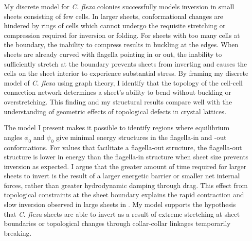 My discrete model for \textit{C. flexa} colonies successfully models inversion in small sheets consisting of few cells. 
In larger sheets, conformational changes are hindered by rings of cells which cannot undergo the requisite stretching or compression required for inversion or folding. 
For sheets with too many cells at the boundary, the inability to compress results in buckling at the edges. 
When sheets are already curved with flagella pointing in or out, the inability to sufficiently stretch at the boundary prevents sheets from inverting and causes the cells on the sheet interior to experience substantial stress.
By framing my discrete model of \textit{C. flexa} using graph theory, I identify that the topology of the cell-cell connection network determines a sheet's ability to bend without buckling or overstretching.
This finding and my structural results compare well with the understanding of geometric effects of topological defects in crystal lattices.

The model I present makes it possible to identify regions where equilibrium angles $\phi_0$ and $\psi_0$ give minimal energy structures in the flagella-in and -out conformations.
For values that facilitate a flagella-out structure, the flagella-out structure is lower in energy than the flagella-in structure when sheet size prevents inversion as expected.
I argue that the greater amount of time required for larger sheets to invert is the result of a larger energetic barrier or smaller net internal forces, rather than greater hydrodynamic damping through drag. 
This effect from topological constraints at the sheet boundary explains the rapid contraction and slow inversion observed in large sheets in \citet{brunet2019}.
My model supports the hypothesis that \textit{C. flexa} sheets are able to invert as a result of extreme stretching at sheet boundaries or topological changes through collar-collar linkages temporarily breaking.
